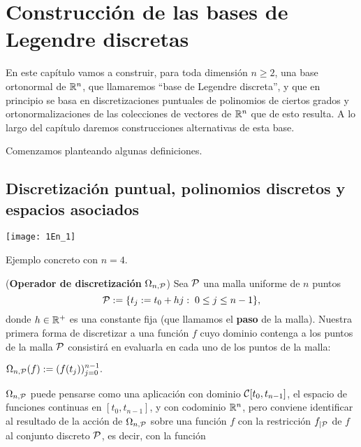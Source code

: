 \chapter{Construcción de las bases de Legendre discretas}
\label{cap 2}

En este capítulo vamos a construir,
para toda dimensión $n \geq 2$,
una base ortonormal de $\mathbb{R}^{n}$,
que llamaremos ``base de Legendre discreta'',
y que en principio se basa en discretizaciones puntuales
de polinomios de ciertos grados
y ortonormalizaciones de las colecciones
de vectores de $\mathbb{R}^{n}$ que de esto resulta. 
A lo largo del capítulo 
daremos construcciones alternativas de esta base.

Comenzamos planteando algunas definiciones.

\section{Discretización puntual, polinomios discretos y espacios asociados}
\label{discretizacion puntual, polinomios discretos y espacios asociados}

\begin{marginfigure}
\texttt{[image: 1En\_1]} 
		\caption{Ejemplo concreto con $n=4$.}
\end{marginfigure}


\begin{defi}
\label{def: operador de discretizacion puntual}
(\textbf{Operador de discretización} $\Omega_{n,\mathcal{P}}$)
Sea $\mathcal{P}$ una malla uniforme 
de $n$ puntos
\[
\mathcal{P}:=\{ t_{j}:=t_{0}+hj : \hspace{0.1cm} 0 \leq j \leq n-1 \},
\]
donde $h \in \mathbb{R}^{+}$ es una constante fija
(que llamamos el \textbf{paso} de la malla).
Nuestra primera forma de discretizar
a una función $f$ cuyo dominio contenga a los puntos
de la malla $\mathcal{P}$
consistirá en evaluarla en cada uno de los
puntos de la malla:

\begin{center}
$\Omega_{n,\mathcal{P}}(f) := (f(t_{j}))_{j=0}^{n-1}.$
\end{center}
\end{defi}


\noindent $\Omega_{n,\mathcal{P}}$
puede pensarse como una aplicación con dominio
$\mathcal{C}[t_{0}, t_{n-1}]$,
el espacio de funciones 
continuas en $[t_{0}, t_{n-1}]$,
y con codominio $\mathbb{R}^{n}$, pero conviene 
identificar al resultado 
de la acción de $\Omega_{n,\mathcal{P}}$ sobre una
función $f$ con la restricción $f_{| \mathcal{P}}$
de 
$f$ al conjunto discreto $\mathcal{P}$,
es decir, con la función

